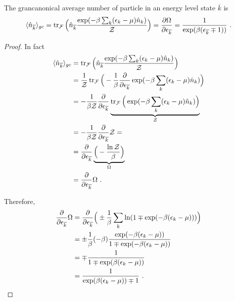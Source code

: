     The grancanonical average number of particle in an energy level state $\overline k$ is 
    \begin{equation*}
        \langle\hat n_{\overline k}\rangle_{gc} = \operatorname{tr}_{\mathcal F} \Big (\hat n_{\overline k} \frac{\exp (-\beta \sum_k (\epsilon_k - \mu) \hat n_k)}{\mathcal Z} \Big) = \frac{\partial\Omega}{\partial\epsilon_{\overline k}} = \frac{1}{\exp(\beta(\epsilon_{\overline k} \mp 1))} ~.
    \end{equation*}
    \begin{proof}
        In fact
        \begin{equation*}
        \begin{aligned}
            \langle\hat n_{\overline k}\rangle_{gc} & = \operatorname{tr}_{\mathcal F} \Big (\hat n_{\overline k} \frac{\exp (-\beta \sum_k (\epsilon_k - \mu) \hat n_k)}{\mathcal Z} \Big) \\ & = \frac{1}{\mathcal Z} \operatorname{tr}_{\mathcal F} \Big (- \frac{1}{\beta} \frac{\partial}{\partial\epsilon_{\overline k}} \exp (-\beta \sum_k (\epsilon_k - \mu) \hat n_k) \Big) \\ & = - \frac{1}{\beta \mathcal Z} \frac{\partial}{\partial\epsilon_{\overline k}} \underbrace{\operatorname{tr}_{\mathcal F} \Big ( \exp (-\beta \sum_k (\epsilon_k - \mu) \hat n_k) \Big)}_{\mathcal Z} \\ & = - \frac{1}{\beta \mathcal Z} \frac{\partial}{\partial\epsilon_{\overline k}} \mathcal Z = \\ & = \frac{\partial}{\partial\epsilon_{\overline k}} \underbrace{\Big ( - \frac{\ln \mathcal Z}{\beta} \Big)}_\Omega \\ & = \frac{\partial}{\partial\epsilon_{\overline k}} \Omega ~.
        \end{aligned}
        \end{equation*}

        Therefore, 
        \begin{equation*}
        \begin{aligned}
            \frac{\partial}{\partial\epsilon_{\overline k}} \Omega & = \frac{\partial}{\partial\epsilon_{\overline k}}  \Big (\pm \frac{1}{\beta} \sum_k \ln (1 \mp \exp (-\beta (\epsilon_k - \mu)) ) \Big ) \\ & = \pm \frac{1}{\beta} (- \beta) \frac{\exp(- \beta(\epsilon_k - \mu))}{1 \mp \exp(- \beta(\epsilon_k - \mu))} \\ & = \mp \frac{1}{1 \mp \exp(\beta(\epsilon_k - \mu))} \\ & = \frac{1}{\exp(\beta(\epsilon_k - \mu))\mp 1} ~.
        \end{aligned}
        \end{equation*}
    \end{proof}

